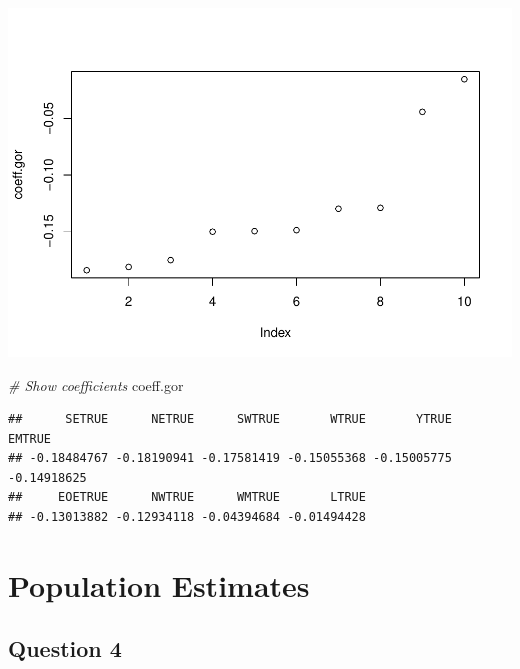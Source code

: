 \documentclass[]{article}
\newenvironment{Shaded}{\begin{snugshade}}{\end{snugshade}}
\newcommand{\KeywordTok}[1]{\textcolor[rgb]{0.13,0.29,0.53}{\textbf{{#1}}}}
\newcommand{\DecValTok}[1]{\textcolor[rgb]{0.00,0.00,0.81}{{#1}}}
\newcommand{\StringTok}[1]{\textcolor[rgb]{0.31,0.60,0.02}{{#1}}}
\newcommand{\CommentTok}[1]{\textcolor[rgb]{0.56,0.35,0.01}{\textit{{#1}}}}
\newcommand{\NormalTok}[1]{{#1}}
\begin{document}
\includegraphics{SurveyFinalRcode_files/figure-latex/unnamed-chunk-3-1.pdf}

\begin{Shaded}
\begin{Highlighting}[]
\CommentTok{# Show coefficients}
\NormalTok{coeff.gor}
\end{Highlighting}
\end{Shaded}

\begin{verbatim}
##      SETRUE      NETRUE      SWTRUE       WTRUE       YTRUE      EMTRUE 
## -0.18484767 -0.18190941 -0.17581419 -0.15055368 -0.15005775 -0.14918625 
##     EOETRUE      NWTRUE      WMTRUE       LTRUE 
## -0.13013882 -0.12934118 -0.04394684 -0.01494428
\end{verbatim}

\section{Population Estimates}\label{population-estimates}

\subsection{Question 4}\label{question-4}

\begin{Shaded}
\end{Shaded}
\end{document}
